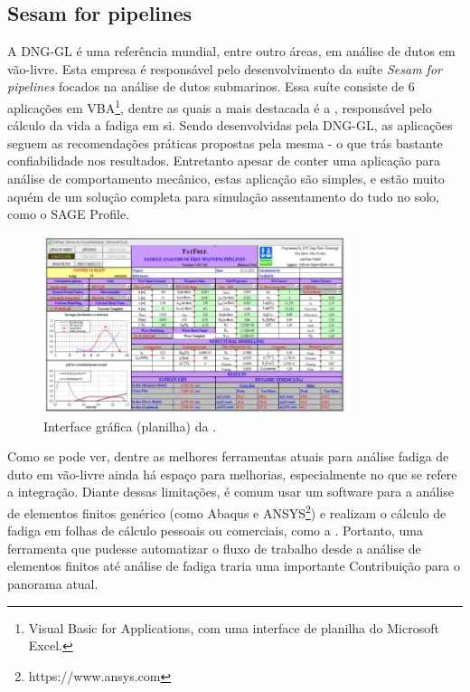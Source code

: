 \subsection{Sesam for pipelines}

A DNG-GL é uma referência mundial, entre outro áreas, em análise de dutos em vão-livre. Esta empresa é responsável pelo desenvolvimento da suíte \textit{Sesam for pipelines} \cite{Sesam} focados na análise de dutos submarinos.
Essa suíte consiste de 6 aplicações em VBA\footnote{Visual Basic for Applications, com uma interface de planilha do Microsoft Excel.}, dentre as quais a mais destacada é a \fatfree, responsável pelo cálculo da vida a fadiga em si. Sendo desenvolvidas pela DNG-GL, as aplicações seguem as recomendações práticas propostas pela mesma - o que trás bastante confiabilidade nos resultados. Entretanto apesar de conter uma aplicação para análise de comportamento mecânico, estas aplicação são simples, e estão muito aquém de um solução completa para simulação assentamento do tudo no solo, como o SAGE Profile.

\begin{figure}[!ht]
    \centering
    \caption{Interface gráfica (planilha) da \fatfree.}\label{fig:fatfree}
    \includegraphics[width=0.8\textwidth]{imagens/fatfree}
\end{figure}

Como se pode ver, dentre as melhores ferramentas atuais para análise fadiga de duto em vão-livre ainda há espaço para melhorias, especialmente no que se refere a integração. Diante dessas limitações, é comum usar um software para a análise de elementos finitos genérico (como Abaqus e ANSYS\footnote{https://www.ansys.com}) e realizam o cálculo de fadiga em folhas de cálculo pessoais ou comerciais, como a \fatfree. Portanto, uma ferramenta que pudesse automatizar o fluxo de trabalho desde a análise de elementos finitos até análise de fadiga traria uma importante Contribuição para o panorama atual.


